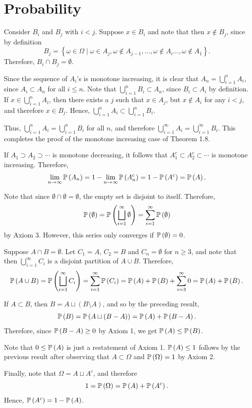 \chapter{Probability}

\begin{ex}
  Consider $B_i$ and $B_j$ with $i<j$. Suppose $x\in B_i$ and note that then
  $x\not\in B_j$, since by definition
  \[
    B_j
    =\left\{\omega\in\Omega\mid
    \omega\in A_j,\omega\not\in A_{j-1},\ldots,
    \omega\not\in A_{i}\ldots,\omega\not\in A_{1}\right\}.
  \]
  Therefore, $B_i\cap B_j=\emptyset$.

  Since the sequence of $A_i$'s is monotone increasing, it is clear that
  $A_n=\bigcup_{i=1}^n A_i$, since $A_i\subset A_n$ for all $i\leq n$. Note that
  $\bigcup_{i=1}^n B_i\subset A_n$, since $B_i\subset A_i$
  by definition. If $x\in \bigcup_{i=1}^n A_i$, then there exists a $j$ such
  that $x\in A_j$, but $x\not\in A_i$ for any $i<j$, and therefore $x\in B_j$.
  Hence, $\bigcup_{i=1}^n A_i\subset\bigcup_{i=1}^n B_i$.

  Thus, $\bigcup_{i=1}^n A_i=\bigcup_{i=1}^n B_i$ for all $n$, and therefore
  $\bigcup_{i=1}^\infty A_i=\bigcup_{i=1}^\infty B_i$. This completes the proof
  of the monotone increasing case of Theorem 1.8.

  If $A_1\supset A_2\supset\cdots$ is monotone decreasing, it follows that
  $A_1^c\subset A_2^c\subset\cdots$ is monotone increasing. Therefore,
  \[
    \lim_{n\to\infty}\P{A_n}
    =1-\lim_{n\to\infty}\P{A_n^c}
    =1-\P{A^c}
    =\P{A}.
  \]
\end{ex}

\begin{ex}
  Note that since $\emptyset\cap\emptyset=\emptyset$, the empty set is disjoint
  to itself. Therefore,
  \[
    \P{\emptyset}
    =\P{\bigsqcup_{i=1}^\infty \emptyset}
    =\sum_{i=1}^\infty\P{\emptyset}
  \]
  by Axiom 3. However, this series only converges if $\P{\emptyset}=0$.

  Suppose $A\cap B=\emptyset$. Let $C_1=A$, $C_2=B$ and $C_n=\emptyset$ for
  $n\geq 3$, and note that then $\bigcup_{i=1}^\infty C_i$ is a disjoint
  partition of $A\cup B$. Therefore,
  \[
    \P{A\cup B}
    =\P{\bigsqcup_{i=1}^\infty C_i}
    =\sum_{i=1}^\infty \P{C_i}
    =\P{A}+\P{B}+\sum_{i=3}^\infty 0
    =\P{A}+\P{B}.
  \]

  If $A\subset B$, then $B=A\sqcup (B\setminus A)$, and so by the preceding
  result,
  \[
    \P{B}=\P{A\sqcup (B\setminus A)}=\P{A}+\P{B\setminus A}.
  \]
  Therefore, since $\P{B\setminus A}\geq 0$ by Axiom 1, we get
  $\P{A}\leq \P{B}$.

  Note that $0\leq \P{A}$ is just a restatement of Axiom 1. $\P{A}\leq 1$
  follows by the previous result after observing that $A\subset \Omega$ and
  $\P{\Omega}=1$ by Axiom 2.

  Finally, note that $\Omega=A\sqcup A^c$, and therefore
  \[
    1=\P{\Omega}=\P{A}+\P{A^c}.
  \]
  Hence, $\P{A^c}=1-\P{A}$.
\end{ex}


